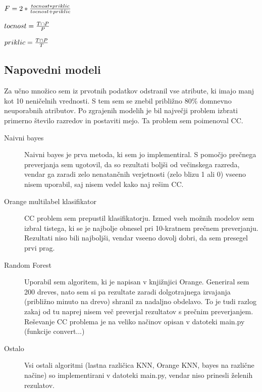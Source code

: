 \documentclass[a4paper,11pt]{article}
\begin{document}
$F = 2*{tocnost*priklic\over tocnost+priklic}$

$tocnost = {T \cap P \over P}$

$priklic = {T \cap P \over T}$
\subsection{Napovedni modeli}
Za učno množico sem iz prvotnih podatkov odstranil vse atribute, ki imajo manj kot 10 neničelnih vrednosti. S tem sem se znebil približno 80\% domnevno neuporabnih atributov. Po zgrajenih modelih je bil največji problem izbrati primerno število razredov in postaviti mejo. Ta problem sem poimenoval CC.
\begin{description}
\item[Naivni bayes] Naivni bayes je prva metoda, ki sem jo implementiral. S pomočjo prečnega preverjanja sem ugotovil, da so rezultati boljši od večinskega razreda, vendar ga zaradi zelo nenatančnih verjetnosti (zelo blizu 1 ali 0) vseeno nisem uporabil, saj nisem vedel kako naj rešim CC.
\item[Orange multilabel klasifikator] CC problem sem prepustil klasifikatorju. Izmed vseh možnih modelov sem izbral tistega, ki se je najbolje obnesel pri 10-kratnem prečnem preverjanju. Rezultati niso bili najboljši, vendar vseeno dovolj dobri, da sem presegel prvi prag.
\item[Random Forest] Uporabil sem algoritem, ki je napisan v knjižnjici Orange. Generiral sem 200 dreves, nato sem si pa rezultate zaradi dolgotrajnega izvajanja (približno minuto na drevo) shranil za nadaljno obdelavo. To je tudi razlog zakaj od tu naprej nisem več preverjal rezultatov s prečnim preverjanjem. Reševanje CC problema je na veliko načinov opisan v datoteki main.py (funkcije convert...)
\item[Ostalo] Vsi ostali algoritmi (lastna različica KNN, Orange KNN, bayes na različne načine) so implementirani v datoteki main.py, vendar niso prinesli želenih rezulatov.
\end{description}
\end{document}
